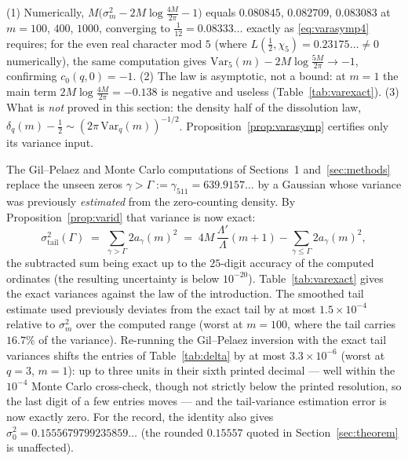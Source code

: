 \begin{remark}\label{rem:varasymp-numerics}
(1) Numerically, $M\bigl(\sigma_m^2-2M\log\tfrac{4M}{2\pi}-1\bigr)$
equals $0.080845$, $0.082709$, $0.083083$ at $m=100$, $400$, $1000$,
converging to $\tfrac1{12}=0.08333\ldots$ exactly as
\eqref{eq:varasymp4} requires; for the even real character mod $5$
(where $L(\tfrac12,\chi_5)=0.23175\ldots\ne0$ numerically), the same
computation gives
$\mathrm{Var}_5(m)-2M\log\tfrac{5M}{2\pi}\to-1$, confirming
$c_0(q,0)=-1$. (2) The law is asymptotic, not a bound: at $m=1$ the
main term $2M\log\tfrac{4M}{2\pi}=-0.138$ is negative and useless
(Table~\ref{tab:varexact}). (3) What is \emph{not} proved in this
section: the density half of the dissolution law,
$\delta_q(m)-\tfrac12\sim(2\pi\,\mathrm{Var}_q(m))^{-1/2}$.
Proposition~\ref{prop:varasymp} certifies only its variance input.
\end{remark}

\begin{remark}
\label{rem:tails}
The Gil--Pelaez and Monte Carlo computations of
Sections~1 and~\ref{sec:methods} replace the unseen zeros
$\gamma>\Gamma:=\gamma_{511}=639.9157\ldots$ by a Gaussian whose
variance was previously \emph{estimated} from the zero-counting
density. By Proposition~\ref{prop:varid} that variance is now exact:
\[
\sigma^2_{\mathrm{tail}}(\Gamma)
\;=\;\sum_{\gamma>\Gamma}2a_\gamma(m)^2
\;=\;4M\,\frac{\Lambda'}{\Lambda}(m+1)
-\sum_{\gamma\le\Gamma}2a_\gamma(m)^2 ,
\]
the subtracted sum being exact up to the $25$-digit accuracy of the
computed ordinates (the resulting uncertainty is below $10^{-20}$).
Table~\ref{tab:varexact} gives the exact variances against the law of
the introduction. The smoothed tail estimate used previously deviates
from the exact tail by at most $1.5\times10^{-4}$ relative to
$\sigma_m^2$ over the computed range (worst at $m=100$, where the tail
carries $16.7\%$ of the variance). Re-running the Gil--Pelaez
inversion with the exact tail variances shifts the entries of
Table~\ref{tab:delta} by at most $3.3\times10^{-6}$ (worst at $q=3$,
$m=1$): up to three units in their sixth printed decimal --- well
within the $10^{-4}$ Monte Carlo cross-check, though not strictly
below the printed resolution, so the last digit of a few entries
moves --- and the tail-variance estimation error is now exactly
zero. For the record, the identity also gives
$\sigma_0^2=0.1555679799235859\ldots$ (the rounded $0.15557$ quoted in
Section~\ref{sec:theorem} is unaffected).
\end{remark}

